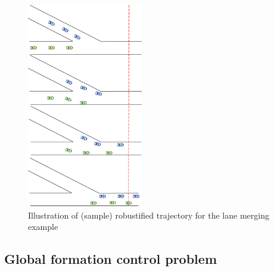 %


\begin{figure}
	\caption{Illustration of (sample) robustified trajectory for the lane merging example}
	\centering
	\includegraphics[width=0.45\textwidth,height=0.5\textheight]{figures/merge2.png}
\end{figure}\label{fig:merge}


\subsection{Global formation control problem}\label{sec:global formation control}

